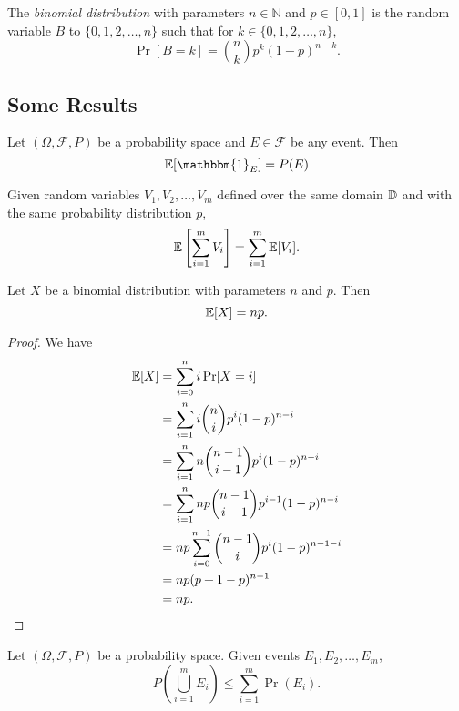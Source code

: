 \begin{definition}
    The \textit{binomial distribution} with parameters $n\in\mathbb{N}$ and $p\in[0,1]$ is the random variable $B$ to $\{0,1,2,\ldots,n\}$ such that for $k\in\{0,1,2,\ldots,n\}$,
    $$\Pr[B=k]=\binom{n}{k}p^k(1-p)^{n-k}.$$
\end{definition}

\subsection{Some Results}

\begin{lemma}
    Let $(\Omega,\mathcal{F},P)$ be a probability space and $E\in\mathcal{F}$ be any event. Then
    $$\expec[\mathbbm{1}_E]=P(E)$$
\end{lemma}

\begin{theorem}
    Given random variables $V_1,V_2,\ldots,V_m$ defined over the same domain $\mathbb{D}$ and with the same probability distribution $p$, 
    $$\mathbb{E}\left[\sum_{i=1}^m V_i\right]=\sum_{i=1}^m\mathbb{E}[V_i].$$
\end{theorem}

\begin{theorem}
\label{binomExpec}
    Let $X$ be a binomial distribution with parameters $n$ and $p$. Then
    $$\mathbb{E}[X]=np.$$
\end{theorem}
\begin{proof}
    We have
    \begin{align*}
        \mathbb{E}[X] &= \sum_{i=0}^n i\Pr[X=i] \\
                  &= \sum_{i=1}^n i\binom{n}{i}p^i(1-p)^{n-i} \\
                  &= \sum_{i=1}^n n\binom{n-1}{i-1}p^i(1-p)^{n-i} \\
                  &= \sum_{i=1}^n np\binom{n-1}{i-1}p^{i-1}(1-p)^{n-i} \\
                  &= np \sum_{i=0}^{n-1} \binom{n-1}{i}p^i(1-p)^{n-1-i} \\
                  &= np (p+1-p)^{n-1} \\
                  &= np.
    \end{align*}
\end{proof}

\begin{theorem}
\label{unionBound}
    Let $(\Omega, \mathcal{F}, P)$ be a probability space. Given events $E_1,E_2,\ldots,E_m$,
    $$P\left(\bigcup_{i=1}^m E_i\right)\leq \sum_{i=1}^m\Pr(E_i).$$
\end{theorem}


